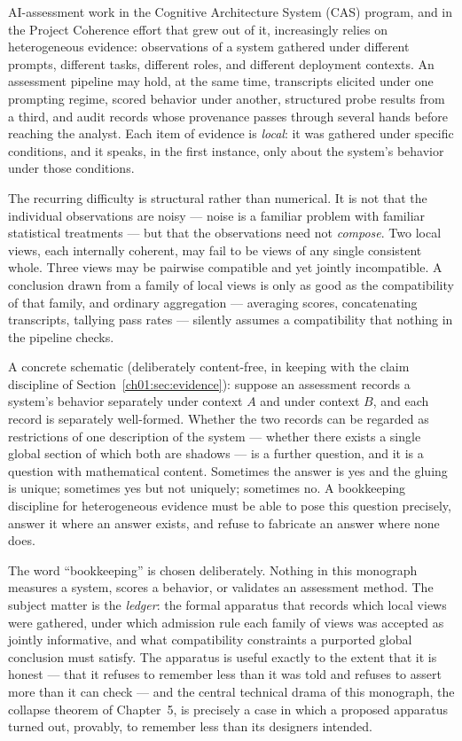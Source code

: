 AI-assessment work in the Cognitive Architecture System (CAS) program, and in
the Project Coherence effort that grew out of it, increasingly relies on
heterogeneous evidence: observations of a system gathered under different
prompts, different tasks, different roles, and different deployment contexts.
An assessment pipeline may hold, at the same time, transcripts elicited under
one prompting regime, scored behavior under another, structured probe results
from a third, and audit records whose provenance passes through several hands
before reaching the analyst. Each item of evidence is \emph{local}: it was
gathered under specific conditions, and it speaks, in the first instance, only
about the system's behavior under those conditions.

The recurring difficulty is structural rather than numerical. It is not that
the individual observations are noisy --- noise is a familiar problem with
familiar statistical treatments --- but that the observations need not
\emph{compose}. Two local views, each internally coherent, may fail to be
views of any single consistent whole. Three views may be pairwise compatible
and yet jointly incompatible. A conclusion drawn from a family of local views
is only as good as the compatibility of that family, and ordinary aggregation
--- averaging scores, concatenating transcripts, tallying pass rates ---
silently assumes a compatibility that nothing in the pipeline checks.

A concrete schematic (deliberately content-free, in keeping with the claim
discipline of Section~\ref{ch01:sec:evidence}): suppose an assessment records
a system's behavior separately under context $A$ and under context $B$, and
each record is separately well-formed. Whether the two records can be
regarded as restrictions of one description of the system --- whether there
exists a single global section of which both are shadows --- is a further
question, and it is a question with mathematical content. Sometimes the
answer is yes and the gluing is unique; sometimes yes but not uniquely;
sometimes no. A bookkeeping discipline for heterogeneous evidence must be
able to pose this question precisely, answer it where an answer exists, and
refuse to fabricate an answer where none does.

The word ``bookkeeping'' is chosen deliberately. Nothing in this monograph
measures a system, scores a behavior, or validates an assessment method. The
subject matter is the \emph{ledger}: the formal apparatus that records which
local views were gathered, under which admission rule each family of views
was accepted as jointly informative, and what compatibility constraints a
purported global conclusion must satisfy. The apparatus is useful exactly to
the extent that it is honest --- that it refuses to remember less than it
was told and refuses to assert more than it can check --- and the central
technical drama of this monograph, the collapse theorem of Chapter~5, is
precisely a case in which a proposed apparatus turned out, provably, to
remember less than its designers intended.

